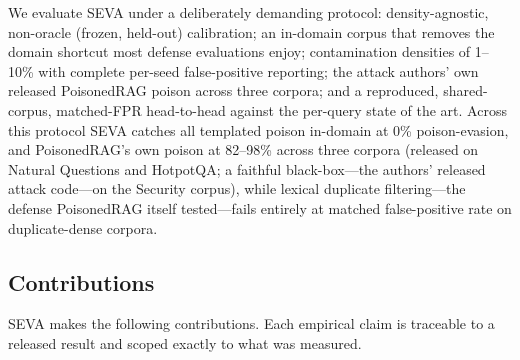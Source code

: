 \documentclass[10pt,journal,compsoc]{IEEEtran}
\begin{document}
We evaluate SEVA under a deliberately demanding protocol: density-agnostic,
non-oracle (frozen, held-out) calibration; an in-domain corpus that removes the
domain shortcut most defense evaluations enjoy; contamination densities of
1--10\% with complete per-seed false-positive reporting; the attack authors' own
released PoisonedRAG poison across three corpora; and a reproduced,
shared-corpus, matched-FPR head-to-head against the per-query state of the
art.
Across this protocol SEVA catches all templated poison in-domain at 0\% poison-evasion,
and PoisonedRAG's own poison at 82--98\% across three corpora (released on Natural
Questions and HotpotQA; a faithful black-box---the authors' released attack code---on
the Security corpus), while lexical
duplicate filtering---the defense PoisonedRAG itself tested---fails entirely at
matched false-positive rate on duplicate-dense corpora.

\subsection{Contributions}
SEVA makes the following contributions. Each empirical claim is traceable to a
released result and scoped exactly to what was measured.
\end{document}
